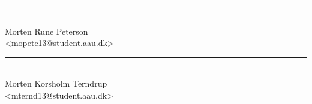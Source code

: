 \vspace{3\baselineskip}\noindent
\begin{minipage}[b]{0.45\textwidth}
 \centering
 \rule{\textwidth}{0.5pt}\\
  Morten Rune Peterson\\
 {\footnotesize <mopete13@student.aau.dk>}
\end{minipage}
\hfill
\begin{minipage}[b]{0.45\textwidth}
 \centering
 \rule{\textwidth}{0.5pt}\\
  Morten Korsholm Terndrup\\
 {\footnotesize <mternd13@student.aau.dk>}
\end{minipage}
